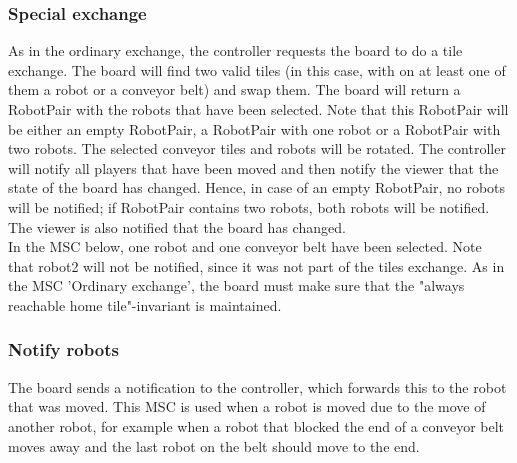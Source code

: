 	\subsubsection{Special exchange}
	\begin{minipage}{\linewidth}
		As in the ordinary exchange, the controller requests the board to do a tile exchange. The board will find two valid tiles (in this case, with on at least one of them a robot or a conveyor belt) and swap them. The board will return a RobotPair with the robots that have been selected. Note that this RobotPair will be either an empty RobotPair, a RobotPair with one robot or a RobotPair with two robots. The selected conveyor tiles and robots will be rotated. The controller will notify all players that have been moved and then notify the viewer that the state of the board has changed. Hence, in case of an empty RobotPair, no robots will be notified; if RobotPair contains two robots, both robots will be notified. The viewer is also notified that the board has changed. \\
In the MSC below, one robot and one conveyor belt have been selected. Note that robot2 will not be notified, since it was not part of the tiles exchange. As in the MSC 'Ordinary exchange', the board must make sure that the "always reachable home tile"-invariant is maintained.

		
	\end{minipage}	

	\subsubsection{Notify robots}
	\begin{minipage}{\linewidth}
		The board sends a notification to the controller, which forwards this to the robot that was moved. This MSC is used when a robot is moved due to the move of another robot, for example when a robot that blocked the end of a conveyor belt moves away and the last robot on the belt should move to the end.

		
	\end{minipage}

